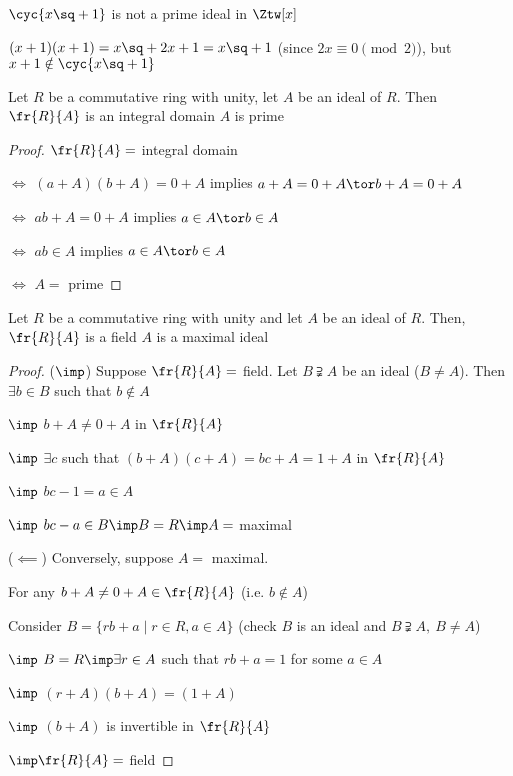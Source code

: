 \begin{example}
  \( \cyc{x\sq + 1} \) is not a prime ideal in \( \Ztw[x] \)
  \begin{note}
    \( (x+1)(x+1) = x\sq + 2x + 1 = x\sq + 1 \) (since \( 2x\equiv 0\pmod 2 \)), but \( x+1 \notin\cyc{x\sq+1} \)
  \end{note}
\end{example}

\begin{theorem}
  Let \( R \) be a commutative ring with unity, let \( A \) be an ideal of \( R \). Then \( \fr{R}{A} \) is an integral domain \iff \( A \) is prime
\end{theorem}

\begin{proof}
  \( \fr{R}{A} = \) integral domain

  \( \iff \) \( (a+A)(b+A) = 0+A \) implies \( a+A = 0+A \tor b+A = 0+A \)

  \( \iff \) \( ab+A = 0+A \) implies \( a\in A \tor b\in A \)

  \( \iff \) \( ab\in A \) implies \( a\in A \tor b\in A \)

  \( \iff \) \( A = \) prime
\end{proof}

\begin{theorem}
  Let \( R \) be a commutative ring with unity and let \( A \) be an ideal of \( R \). Then, \( \fr{R}{A} \) is a field \iff \( A \) is a maximal ideal
\end{theorem}

\begin{proof}
  (\( \imp \)) Suppose \( \fr{R}{A} = \) field. Let \( B\supsetneqq A \) be an ideal (\( B\neq A \)). Then \( \exists b \in B \) such that \( b\not\in A \)

    \( \imp \) \( b+A \neq 0+A \) in \( \fr{R}{A} \)

    \( \imp \) \( \exists c \) such that \( (b+A)(c+A) = bc+A = 1+A \) in \( \fr{R}{A} \)

    \( \imp \) \( bc-1 = a \in A \)

    \( \imp \) \( bc-a \in B \imp B = R \imp A = \) maximal

    (\( \impliedby \)) Conversely, suppose \( A = \) maximal.

    For any \( b+A \neq 0+A \in\fr{R}{A} \) (i.e. \( b\not\in A \))

    Consider \( B = \{rb+a \mid r\in R, a\in A\} \) (check \( B \) is an ideal and \( B\supsetneqq A,\ B\neq A \))

    \( \imp \) \( B = R \imp \exists r\in A \) such that \( rb+a = 1 \) for some \( a\in A \)

    \( \imp \) \( (r+A)(b+A) = (1+A) \)

    \( \imp \) \( (b+A) \) is invertible in \( \fr{R}{A} \)

    \( \imp \fr{R}{A} = \) field
\end{proof}


